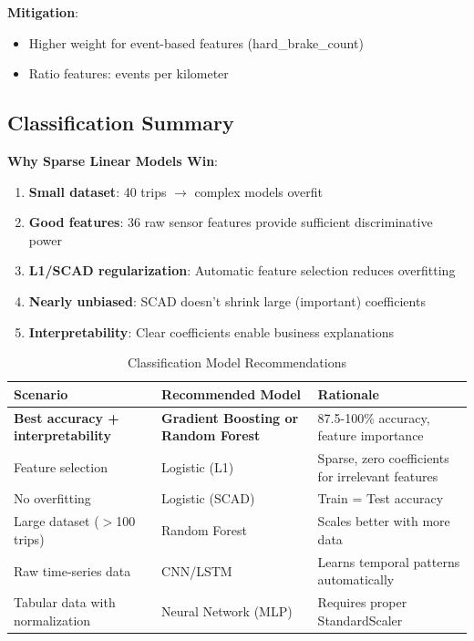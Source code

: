 \documentclass[11pt,a4paper]{article}
\begin{document}
\textbf{Mitigation}:
\begin{itemize}[leftmargin=*]
    \item Higher weight for event-based features (hard\_brake\_count)
    \item Ratio features: events per kilometer
\end{itemize}

\subsection{Classification Summary}

\textbf{Why Sparse Linear Models Win}:
\begin{enumerate}[leftmargin=*]
    \item \textbf{Small dataset}: 40 trips $\rightarrow$ complex models overfit
    \item \textbf{Good features}: 36 raw sensor features provide sufficient discriminative power
    \item \textbf{L1/SCAD regularization}: Automatic feature selection reduces overfitting
    \item \textbf{Nearly unbiased}: SCAD doesn't shrink large (important) coefficients
    \item \textbf{Interpretability}: Clear coefficients enable business explanations
\end{enumerate}

\begin{table}[H]
\centering
\caption{Classification Model Recommendations}
\begin{tabular}{p{4cm}p{4cm}p{4.5cm}}
\toprule
\textbf{Scenario} & \textbf{Recommended Model} & \textbf{Rationale} \\
\midrule
\textbf{Best accuracy + interpretability} & \textbf{Gradient Boosting or Random Forest} & 87.5-100\% accuracy, feature importance \\
Feature selection & Logistic (L1) & Sparse, zero coefficients for irrelevant features \\
No overfitting & Logistic (SCAD) & Train = Test accuracy \\
Large dataset ($>$100 trips) & Random Forest & Scales better with more data \\
Raw time-series data & CNN/LSTM & Learns temporal patterns automatically \\
Tabular data with normalization & Neural Network (MLP) & Requires proper StandardScaler \\
\bottomrule
\end{tabular}
\end{table}
\end{document}
